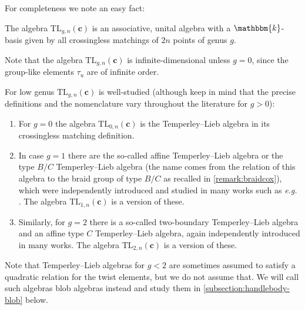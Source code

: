 \documentclass[a4paper,11pt]{amsart}
\newcommand{\eg}{\textsl{e.g.}}
\newcommand{\setstuff}[1]{\mathrm{#1}}
\newcommand{\KK}{\mathbbm{k}}
\newcommand{\bsym}[1]{\boldsymbol{#1}}
\newcommand{\cpar}{\bsym{c}}
\numberwithin{equation}{section}
\let\fullref\autoref
\begin{document}
For completeness we note an easy fact:

\begin{lemmaqed}\label{lemma:tl-basis}
The algebra $\setstuff{TL}_{g,n}(\cpar)$ is an associative, unital 
algebra with a $\KK$-basis given by all crossingless 
matchings of $2n$ points of genus $g$.
\end{lemmaqed}

Note that the algebra $\setstuff{TL}_{g,n}(\cpar)$ is 
infinite-dimensional unless $g=0$, since the group-like elements $\tau_{u}$ 
are of infinite order.

\begin{remark}\label{remark:tl}
For low genus $\setstuff{TL}_{g,n}(\cpar)$ is well-studied 
(although keep in mind that the precise definitions and the 
nomenclature vary 
throughout the literature for $g>0$):
\begin{enumerate}

\setlength\itemsep{0.15cm}

\item For $g=0$ the algebra 
$\setstuff{TL}_{0,n}(\cpar)$ is the 
Temperley--Lieb algebra in its crossingless matching definition.

\item In case $g=1$ there are the so-called 
affine Temperley--Lieb algebra or the
type $B/C$ Temperley--Lieb algebra 
(the name comes from the relation of this algebra 
to the braid group of type $B/C$ 
as recalled in \fullref{remark:braidcox}), 
which were independently introduced 
and studied in many works such as {\eg} \cite{GrLe-affine-tl}.
The algebra $\setstuff{TL}_{1,n}(\cpar)$ is a version of these.

\item Similarly, for 
$g=2$ there is a so-called two-boundary 
Temperley--Lieb algebra 
and an affine type $C$ Temperley--Lieb 
algebra, again independently 
introduced in many works.
The algebra $\setstuff{TL}_{2,n}(\cpar)$ 
is a version of these.

\end{enumerate}
Note that Temperley--Lieb algebras for $g<2$
are sometimes assumed to satisfy a quadratic relation for the twist 
elements, but we do not assume that.
We will call such algebras blob algebras instead 
and study them in \fullref{subsection:handlebody-blob} below.
\end{remark}
\end{document}
